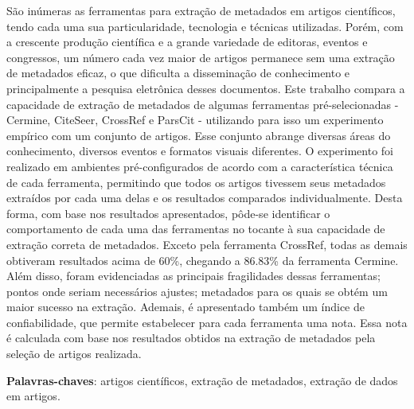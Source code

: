 
\setlength{\absparsep}{18pt} %
\begin{resumo}


São inúmeras as ferramentas para extração de metadados em artigos científicos, tendo cada uma sua particularidade, tecnologia e técnicas utilizadas. Porém, com a crescente produção científica e a grande variedade de editoras, eventos e congressos, um número cada vez maior de artigos permanece sem uma extração de metadados eficaz, o que dificulta a disseminação de conhecimento e principalmente a pesquisa eletrônica desses documentos. Este trabalho compara a capacidade de extração de metadados de algumas ferramentas pré-selecionadas - Cermine, CiteSeer, CrossRef e ParsCit - utilizando para isso um experimento empírico com um conjunto de artigos. Esse conjunto abrange diversas áreas do conhecimento, diversos eventos e formatos visuais diferentes. O experimento foi realizado em ambientes pré-configurados de acordo com a característica técnica de cada ferramenta, permitindo que todos os artigos tivessem seus metadados extraídos por cada uma delas e os resultados comparados individualmente. Desta forma, com base nos resultados apresentados, pôde-se identificar o comportamento de cada uma das ferramentas no tocante à sua capacidade de extração correta de metadados. Exceto pela ferramenta CrossRef, todas as demais obtiveram resultados acima de 60\%, chegando a 86.83\% da ferramenta Cermine. Além disso, foram evidenciadas as principais fragilidades dessas ferramentas; pontos onde seriam necessários ajustes; metadados para os quais se obtém um maior sucesso na extração. Ademais, é apresentado também um índice de confiabilidade, que permite estabelecer para cada ferramenta uma nota. Essa nota é calculada com base nos resultados obtidos na extração de metadados pela seleção de artigos realizada.

\textbf{Palavras-chaves}: artigos científicos, extração de metadados, extração de dados em artigos.

\end{resumo}

